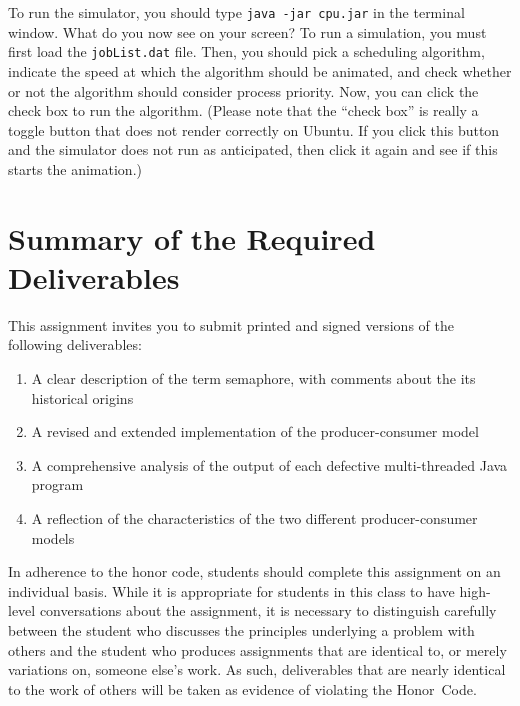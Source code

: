   To run the simulator, you should type {\tt java -jar cpu.jar} in the terminal window.  What do you now see on your
  screen? To run a simulation, you must first load the {\tt jobList.dat} file.  Then, you should pick a scheduling
  algorithm, indicate the speed at which the algorithm should be animated, and check whether or not the algorithm should
  consider process priority. Now, you can click the check box to run the algorithm. (Please note that the ``check box''
  is really a toggle button that does not render correctly on Ubuntu. If you click this button and the simulator does
  not run as anticipated, then click it again and see if this starts the animation.)

\section*{Summary of the Required Deliverables}

This assignment invites you to submit printed and signed versions of the following deliverables: 

\begin{enumerate}

  \item A clear description of the term semaphore, with comments about the its historical origins 

  \item A revised and extended implementation of the producer-consumer model

  \item A comprehensive analysis of the output of each defective multi-threaded Java program

  \item A reflection of the characteristics of the two different producer-consumer models

\end{enumerate}

In adherence to the honor code, students should complete this assignment on an individual basis. While it is appropriate
for students in this class to have high-level conversations about the assignment, it is necessary to distinguish
carefully between the student who discusses the principles underlying a problem with others and the student who produces
assignments that are identical to, or merely variations on, someone else's work.  As such, deliverables that are nearly
identical to the work of others will be taken as evidence of violating the \mbox{Honor Code}.  



  
